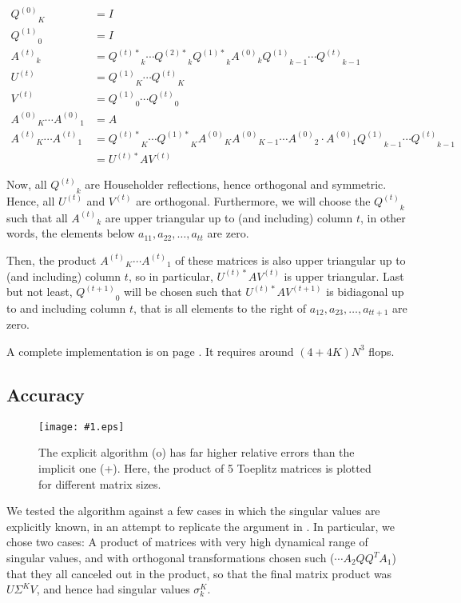 \documentclass[11pt]{article}
\renewcommand{\j}[2]{\ensuremath{#1^{(#2)}}}	%
\newcommand{\jt}[2]{\ensuremath{#1^{(#2)*}}}	%
\newcommand{\mypic}[2]
{
\begin{figure}[tbhp] 
       \centering
	\texttt{[image: \#1.eps]}
       \caption{\label{f:#1}#2}
 \end{figure} 
}
\begin{document}
\begin{align*}
	\j Q0_K 	&= I 	\\
	\j Q1_0 	&= I	\\
	\j At_k 	&= \jt Qt_k \cdots \jt Q2_k \jt Q1_k \j A0_k \j Q1_{k-1} \cdots \j Qt_{k-1} \\
	\j Ut		&= \j Q1_K \cdots \j Qt_K \\
	\j Vt		&= \j Q1_0 \cdots \j Qt_0 \\
	\j A0_K \cdots \j A0_1 &= A \\
	\j At_K \cdots \j At_1 &= \jt Qt_K \cdots \jt Q1_K \j A0_K\j A0_{K-1}\cdots\j A0_2\cdot \j A0_1 \j Q1_{k-1} \cdots \j Qt_{k-1} \\
					&= \jt Ut A \j Vt
\end{align*}

Now, all $\j Qt_k$ are Householder reflections, hence orthogonal and symmetric. Hence, all \j Ut and \j Vt are orthogonal. Furthermore, we will choose the $\j Qt_k$ such that all $\j At_k$ are upper triangular up to (and including) column $t$, in other words, the elements below $a_{11}, a_{22}, \ldots, a_{tt}$ are zero.

Then, the product $\j At_K \cdots \j At_1$ of these matrices is also upper triangular up to (and including) column $t$, so in particular, $\jt Ut A \j Vt$ is upper triangular. Last but not least, $\j Q{t+1}_0$ will be chosen such that $\jt Ut A \j V{t+1}$ is bidiagonal up to and including column $t$, that is all elements to the right of $a_{12}, a_{23}, \ldots, a_{tt+1}$ are zero.

A complete implementation is on page \pageref{rc:bidigprod}. It requires around $(4+4K) N^3$ flops.

\subsection{Accuracy}
\mypic{re2K5NNN}{The explicit algorithm (o) has far higher relative errors than the implicit one (+). Here, the product of 5 Toeplitz matrices is plotted for different matrix sizes.}

We tested the algorithm against a few cases in which the singular values are explicitly known, in an attempt to replicate the argument in \cite{587733}. In particular, we chose two cases: A product of matrices with very high dynamical range of singular values, and with orthogonal transformations chosen such ($\cdots A_2 Q Q^T A_1$) that they all canceled out in the product, so that the final matrix product was $U\Sigma^KV$, and hence had singular values $\sigma_k^K$.
\end{document}
